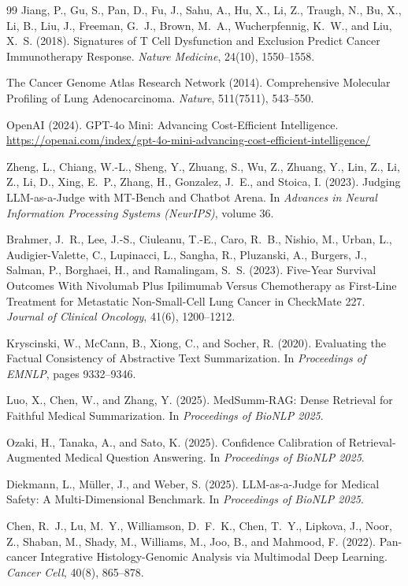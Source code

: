 \documentclass[11pt,twocolumn]{article}
\begin{document}
\begin{thebibliography}{99}
Jiang, P., Gu, S., Pan, D., Fu, J., Sahu, A., Hu, X., Li, Z., Traugh, N., Bu, X., Li, B., Liu, J., Freeman, G.~J., Brown, M.~A., Wucherpfennig, K.~W., and Liu, X.~S. (2018).
Signatures of T Cell Dysfunction and Exclusion Predict Cancer Immunotherapy Response.
\emph{Nature Medicine}, 24(10), 1550--1558.

The Cancer Genome Atlas Research Network (2014).
Comprehensive Molecular Profiling of Lung Adenocarcinoma.
\emph{Nature}, 511(7511), 543--550.

OpenAI (2024).
GPT-4o Mini: Advancing Cost-Efficient Intelligence.
\url{https://openai.com/index/gpt-4o-mini-advancing-cost-efficient-intelligence/}

Zheng, L., Chiang, W.-L., Sheng, Y., Zhuang, S., Wu, Z., Zhuang, Y., Lin, Z., Li, Z., Li, D., Xing, E.~P., Zhang, H., Gonzalez, J.~E., and Stoica, I. (2023).
Judging LLM-as-a-Judge with MT-Bench and Chatbot Arena.
In \emph{Advances in Neural Information Processing Systems (NeurIPS)}, volume 36.

Brahmer, J.~R., Lee, J.-S., Ciuleanu, T.-E., Caro, R.~B., Nishio, M., Urban, L., Audigier-Valette, C., Lupinacci, L., Sangha, R., Pluzanski, A., Burgers, J., Salman, P., Borghaei, H., and Ramalingam, S.~S. (2023).
Five-Year Survival Outcomes With Nivolumab Plus Ipilimumab Versus Chemotherapy as First-Line Treatment for Metastatic Non-Small-Cell Lung Cancer in CheckMate 227.
\emph{Journal of Clinical Oncology}, 41(6), 1200--1212.

Kryscinski, W., McCann, B., Xiong, C., and Socher, R. (2020).
Evaluating the Factual Consistency of Abstractive Text Summarization.
In \emph{Proceedings of EMNLP}, pages 9332--9346.

Luo, X., Chen, W., and Zhang, Y. (2025).
MedSumm-RAG: Dense Retrieval for Faithful Medical Summarization.
In \emph{Proceedings of BioNLP 2025}.

Ozaki, H., Tanaka, A., and Sato, K. (2025).
Confidence Calibration of Retrieval-Augmented Medical Question Answering.
In \emph{Proceedings of BioNLP 2025}.

Diekmann, L., M{\"u}ller, J., and Weber, S. (2025).
LLM-as-a-Judge for Medical Safety: A Multi-Dimensional Benchmark.
In \emph{Proceedings of BioNLP 2025}.

Chen, R.~J., Lu, M.~Y., Williamson, D.~F.~K., Chen, T.~Y., Lipkova, J., Noor, Z., Shaban, M., Shady, M., Williams, M., Joo, B., and Mahmood, F. (2022).
Pan-cancer Integrative Histology-Genomic Analysis via Multimodal Deep Learning.
\emph{Cancer Cell}, 40(8), 865--878.

\end{thebibliography}
\end{document}
